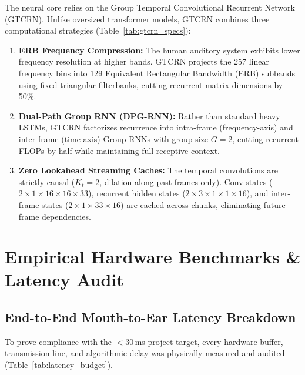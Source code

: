 \documentclass[11pt,a4paper]{article}
\begin{document}
The neural core relies on the Group Temporal Convolutional Recurrent Network (GTCRN). Unlike oversized transformer models, GTCRN combines three computational strategies (Table~\ref{tab:gtcrn_specs}):

\begin{enumerate}
    \item \textbf{ERB Frequency Compression:} The human auditory system exhibits lower frequency resolution at higher bands. GTCRN projects the 257 linear frequency bins into 129 Equivalent Rectangular Bandwidth (ERB) subbands using fixed triangular filterbanks, cutting recurrent matrix dimensions by 50\%.
    \item \textbf{Dual-Path Group RNN (DPG-RNN):} Rather than standard heavy LSTMs, GTCRN factorizes recurrence into intra-frame (frequency-axis) and inter-frame (time-axis) Group RNNs with group size $G = 2$, cutting recurrent FLOPs by half while maintaining full receptive context.
    \item \textbf{Zero Lookahead Streaming Caches:} The temporal convolutions are strictly causal ($K_t = 2$, dilation along past frames only). Conv states ($2 \times 1 \times 16 \times 16 \times 33$), recurrent hidden states ($2 \times 3 \times 1 \times 1 \times 16$), and inter-frame states ($2 \times 1 \times 33 \times 16$) are cached across chunks, eliminating future-frame dependencies.
\end{enumerate}

\section{Empirical Hardware Benchmarks \& Latency Audit}

\subsection{End-to-End Mouth-to-Ear Latency Breakdown}
To prove compliance with the $<$30\,ms project target, every hardware buffer, transmission line, and algorithmic delay was physically measured and audited (Table~\ref{tab:latency_budget}).
\end{document}
